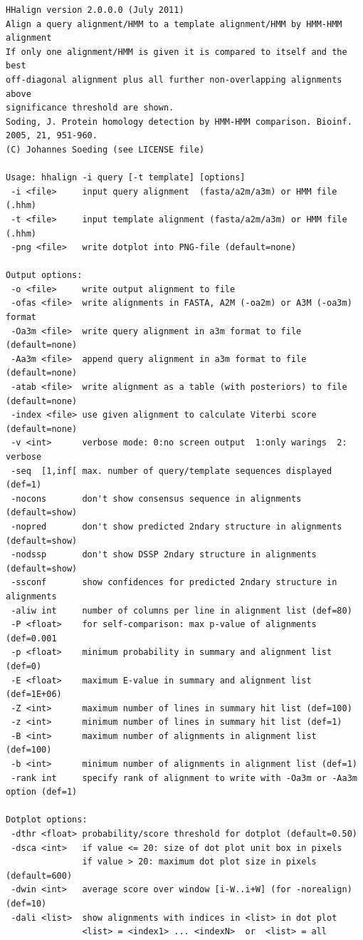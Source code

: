 \documentclass[11pt,a4paper]{article}
\begin{document}
\small \begin{verbatim}
HHalign version 2.0.0.0 (July 2011)
Align a query alignment/HMM to a template alignment/HMM by HMM-HMM alignment
If only one alignment/HMM is given it is compared to itself and the best
off-diagonal alignment plus all further non-overlapping alignments above 
significance threshold are shown.
Soding, J. Protein homology detection by HMM-HMM comparison. Bioinf. 2005, 21, 951-960.
(C) Johannes Soeding (see LICENSE file)

Usage: hhalign -i query [-t template] [options]  
 -i <file>     input query alignment  (fasta/a2m/a3m) or HMM file (.hhm)
 -t <file>     input template alignment (fasta/a2m/a3m) or HMM file (.hhm)
 -png <file>   write dotplot into PNG-file (default=none)           

Output options:                                                           
 -o <file>     write output alignment to file
 -ofas <file>  write alignments in FASTA, A2M (-oa2m) or A3M (-oa3m) format   
 -Oa3m <file>  write query alignment in a3m format to file (default=none)
 -Aa3m <file>  append query alignment in a3m format to file (default=none)
 -atab <file>  write alignment as a table (with posteriors) to file (default=none)
 -index <file> use given alignment to calculate Viterbi score (default=none)
 -v <int>      verbose mode: 0:no screen output  1:only warings  2: verbose
 -seq  [1,inf[ max. number of query/template sequences displayed  (def=1)  
 -nocons       don't show consensus sequence in alignments (default=show) 
 -nopred       don't show predicted 2ndary structure in alignments (default=show) 
 -nodssp       don't show DSSP 2ndary structure in alignments (default=show) 
 -ssconf       show confidences for predicted 2ndary structure in alignments
 -aliw int     number of columns per line in alignment list (def=80)
 -P <float>    for self-comparison: max p-value of alignments (def=0.001
 -p <float>    minimum probability in summary and alignment list (def=0) 
 -E <float>    maximum E-value in summary and alignment list (def=1E+06)     
 -Z <int>      maximum number of lines in summary hit list (def=100)       
 -z <int>      minimum number of lines in summary hit list (def=1)       
 -B <int>      maximum number of alignments in alignment list (def=100)    
 -b <int>      minimum number of alignments in alignment list (def=1)    
 -rank int     specify rank of alignment to write with -Oa3m or -Aa3m option (def=1)

Dotplot options:
 -dthr <float> probability/score threshold for dotplot (default=0.50)        
 -dsca <int>   if value <= 20: size of dot plot unit box in pixels           
               if value > 20: maximum dot plot size in pixels (default=600)   
 -dwin <int>   average score over window [i-W..i+W] (for -norealign) (def=10)
 -dali <list>  show alignments with indices in <list> in dot plot            
               <list> = <index1> ... <indexN>  or  <list> = all              


\end{verbatim}
\end{document}
